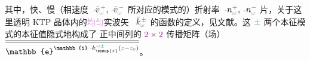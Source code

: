 其中，\textcolor{PineGreen}{快}、\textcolor{PineGreen}{慢}（\textcolor{PineGreen}{相速度} $\xint{\begin{smallmatrix} ~ \\ {}^{}_{\mathcolor{gray}{-}} \\ ~ \end{smallmatrix}}{17}{\bar{v}}_{\mathcolor{gray}{\omega}}^{\;\! \textcolor{PineGreen}{+}}, \xint{\begin{smallmatrix} ~ \\ {}^{}_{\mathcolor{gray}{-}} \\ ~ \end{smallmatrix}}{17}{\bar{v}}_{\mathcolor{gray}{\omega}}^{\;\! \textcolor{PineGreen}{-}}$ 所对应的\textcolor{PineGreen}{模式}的）\textcolor{PineGreen}{折射率} $\xint{\begin{smallmatrix} ~ \\ {}^{}_{\mathcolor{gray}{-}} \\ ~ \end{smallmatrix}}{11}{n}^{\textcolor{PineGreen}{+}}_{\mathcolor{gray}{\omega}}, \xint{\begin{smallmatrix} ~ \\ {}^{}_{\mathcolor{gray}{-}} \\ ~ \end{smallmatrix}}{11}{n}^{\textcolor{PineGreen}{-}}_{\mathcolor{gray}{\omega}}$ 片，关于这里透明 KTP 晶体内的\textcolor{Plum}{均匀}实\textcolor{PineGreen}{波矢} $\xint{\begin{smallmatrix} ~ \\ {}^{}_{\mathcolor{gray}{-}} \\ ~ \end{smallmatrix}}{15}{\bar{k}}^{\;\! \textcolor{PineGreen}{\pm}}_{\mathcolor{gray}{\omega}}$ 的函数的定义，见文献\cite{berryOpticalSingularitiesBirefringent2003,xieAnalytic3DVector}。这 $\textcolor{PineGreen}{\pm}$ 两个\textcolor{PineGreen}{本征模}式的\textcolor{PineGreen}{本征值}隐式地构成了  正中间列的 $\textcolor{Plum}{2 \times 2}$  \textcolor{PineGreen}{传播矩阵}（场）$\overline{\overline{\mathbb{e}^{\mathbb{i} \xint{\begin{smallmatrix} ~ \\ {}^{}_{\mathcolor{gray}{-}} \\ ~ \end{smallmatrix}}{15}{k}_{\symup{z}}^{\;\! \mathcolor{gray}{\omega} \textcolor{PineGreen}{\pm}} \left( \mathcolor{gray}{z} - \mathcolor{gray}{z_0} \right)}}}$。

